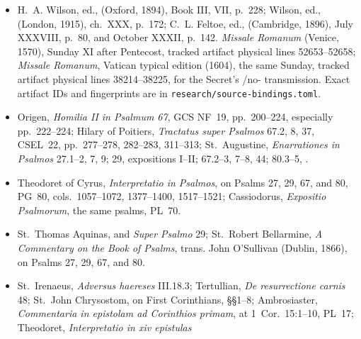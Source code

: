 {\begin{itemize}[itemsep=0em,topsep=0.15em,parsep=0pt]
\emph{Liber Psalmorum}, discussion ``De Psalmis Asaphi nomine inscriptis,''
printed pp.~217--218,
.
\ifdefined\TriptychSynthesisEdition\else
\item H.~A. Wilson, ed., 
(Oxford, 1894), Book III, VII, p.~228; Wilson, ed.,
(London, 1915), ch.~XXX, p.~172; C.~L. Feltoe, ed.,
(Cambridge, 1896), July XXXVIII, p.~80, and October XXXII, p.~142.
\emph{Missale Romanum} (Venice, 1570), Sunday XI after Pentecost, tracked
artifact physical lines 52653--52658; \emph{Missale Romanum}, Vatican typical
edition (1604), the same Sunday, tracked artifact physical lines 38214--38225,
for the Secret's /no- transmission. Exact artifact IDs and
fingerprints are in \texttt{research/source-bindings.toml}.
\fi
\item Origen, \emph{Homilia II in Psalmum 67}, GCS NF~19, pp.~200--224,
especially pp.~222--224; Hilary of Poitiers, \emph{Tractatus super Psalmos}
67.2, 8, 37, CSEL~22, pp.~277--278, 282--283, 311--313; St.~Augustine,
\emph{Enarrationes in Psalmos} 27.1--2, 7, 9; 29,
expositions I--II; 67.2--3, 7--8, 44; 80.3--5,
.
\item Theodoret of Cyrus, \emph{Interpretatio in Psalmos}, on Psalms 27, 29,
67, and 80, PG~80, cols.~1057--1072, 1377--1400, 1517--1521; Cassiodorus,
\emph{Expositio Psalmorum}, the same psalms, PL~70.
\item St.~Thomas Aquinas,  and
\emph{Super Psalmo} 29; St.~Robert Bellarmine, \emph{A Commentary on the
Book of Psalms}, trans. John O'Sullivan (Dublin, 1866), on Psalms 27, 29, 67,
and 80.
\item St.~Irenaeus, \emph{Adversus haereses} III.18.3; Tertullian,
\emph{De resurrectione carnis} 48; St.~John Chrysostom,
 on First Corinthians, §§1--8;
Ambrosiaster, \emph{Commentaria in epistolam ad Corinthios primam}, at
1~Cor.~15:1--10, PL~17; Theodoret, \emph{Interpretatio in xiv epistulas
}
\end{itemize}}
